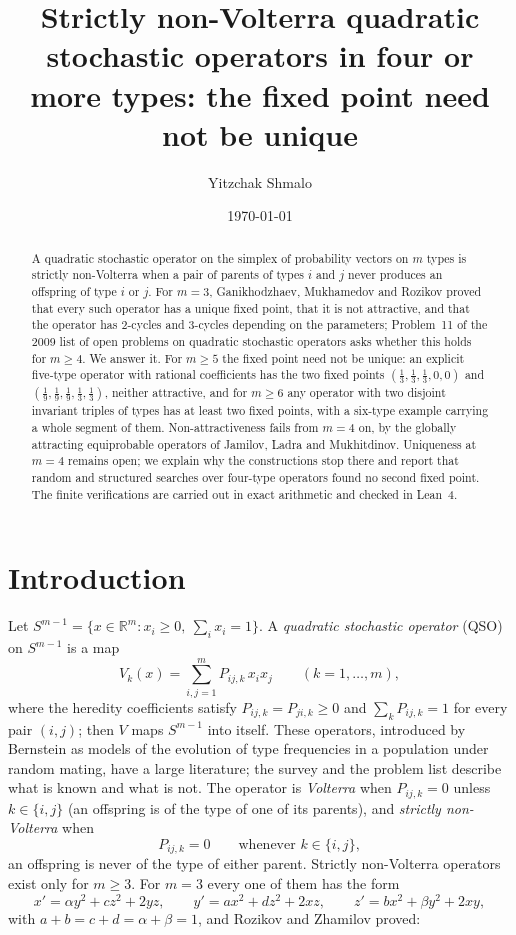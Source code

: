 \documentclass[11pt]{amsart}
\title[Non-unique fixed points of strictly non-Volterra operators]{Strictly non-Volterra quadratic stochastic operators in four or more types: the fixed point need not be unique}
\author{Yitzchak Shmalo}
\date{\today}
\theoremstyle{definition}
\newcommand{\R}{\mathbb{R}}
\newcommand{\Simp}{S^{m-1}}
\begin{document}
\begin{abstract}
A quadratic stochastic operator on the simplex of probability vectors on $m$ types is strictly non-Volterra when a pair of parents of types $i$ and $j$ never produces an offspring of type $i$ or $j$. For $m=3$, Ganikhodzhaev, Mukhamedov and Rozikov proved that every such operator has a unique fixed point, that it is not attractive, and that the operator has $2$-cycles and $3$-cycles depending on the parameters; Problem~11 of the 2009 list of open problems on quadratic stochastic operators asks whether this holds for $m\ge4$. We answer it. For $m\ge5$ the fixed point need not be unique: an explicit five-type operator with rational coefficients has the two fixed points $(\frac13,\frac13,\frac13,0,0)$ and $(\frac19,\frac19,\frac19,\frac13,\frac13)$, neither attractive, and for $m\ge6$ any operator with two disjoint invariant triples of types has at least two fixed points, with a six-type example carrying a whole segment of them. Non-attractiveness fails from $m=4$ on, by the globally attracting equiprobable operators of Jamilov, Ladra and Mukhitdinov. Uniqueness at $m=4$ remains open; we explain why the constructions stop there and report that random and structured searches over four-type operators found no second fixed point. The finite verifications are carried out in exact arithmetic and checked in Lean~4.
\end{abstract}

\maketitle

\section{Introduction}

Let $\Simp=\{x\in\R^m: x_i\ge0,\ \sum_ix_i=1\}$. A \emph{quadratic stochastic operator} (QSO) on $\Simp$ is a map
\begin{equation}\label{eq:qso}
V_k(x)=\sum_{i,j=1}^m P_{ij,k}\,x_ix_j\qquad(k=1,\dots,m),
\end{equation}
where the heredity coefficients satisfy $P_{ij,k}=P_{ji,k}\ge0$ and $\sum_kP_{ij,k}=1$ for every pair $(i,j)$; then $V$ maps $\Simp$ into itself. These operators, introduced by Bernstein as models of the evolution of type frequencies in a population under random mating, have a large literature; the survey \cite{GMR11} and the problem list \cite{GR09} describe what is known and what is not. The operator is \emph{Volterra} when $P_{ij,k}=0$ unless $k\in\{i,j\}$ (an offspring is of the type of one of its parents), and \emph{strictly non-Volterra} when
\begin{equation}\label{eq:snv}
P_{ij,k}=0\qquad\text{whenever }k\in\{i,j\},
\end{equation}
an offspring is never of the type of either parent. Strictly non-Volterra operators exist only for $m\ge3$. For $m=3$ every one of them has the form
\[
x'=\alpha y^2+cz^2+2yz,\qquad y'=ax^2+dz^2+2xz,\qquad z'=bx^2+\beta y^2+2xy,
\]
with $a+b=c+d=\alpha+\beta=1$, and Rozikov and Zhamilov \cite{RZ09} proved:
\end{document}
